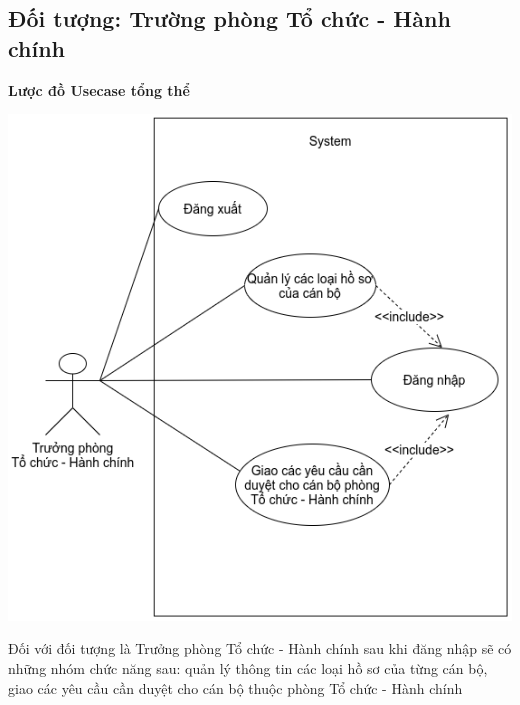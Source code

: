 \subsection{Đối tượng: Trường phòng Tổ chức - Hành chính}
\textbf{Lược đồ Usecase tổng thể}
\begin{center}
  \captionsetup{type=figure}
  \includegraphics[scale=0.7]{img/UML/Manager/truongphong.png}
\end{center}
Đối với đối tượng là Trưởng phòng Tổ chức - Hành chính sau khi đăng nhập sẽ có những nhóm chức năng sau: quản lý thông tin các loại hồ sơ của từng cán bộ, giao các yêu cầu cần duyệt cho cán bộ thuộc phòng Tổ chức - Hành chính
